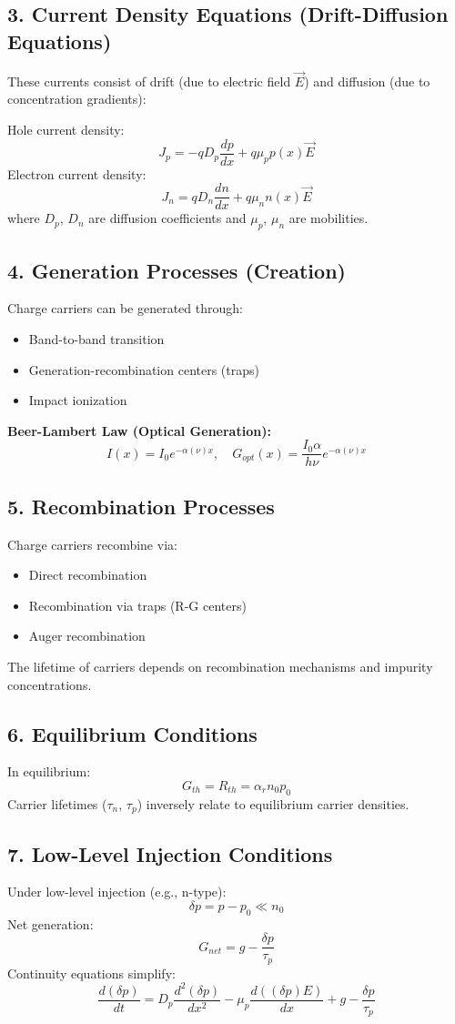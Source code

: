\documentclass{article}
\begin{document}
\subsection*{3. Current Density Equations (Drift-Diffusion Equations)}
These currents consist of drift (due to electric field $\vec{E}$) and diffusion (due to concentration gradients):

Hole current density:
\[
J_p = -qD_p\frac{dp}{dx} + q\mu_p p(x)\vec{E}
\]
Electron current density:
\[
J_n = qD_n\frac{dn}{dx} + q\mu_n n(x)\vec{E}
\]
where $D_p$, $D_n$ are diffusion coefficients and $\mu_p$, $\mu_n$ are mobilities.

\subsection*{4. Generation Processes (Creation)}
Charge carriers can be generated through:
\begin{itemize}
\item Band-to-band transition
\item Generation-recombination centers (traps)
\item Impact ionization
\end{itemize}

\textbf{Beer-Lambert Law (Optical Generation):}
\[
I(x) = I_0 e^{-\alpha(\nu)x}, \quad G_{opt}(x) = \frac{I_0\alpha}{h\nu} e^{-\alpha(\nu)x}
\]

\subsection*{5. Recombination Processes}
Charge carriers recombine via:
\begin{itemize}
\item Direct recombination
\item Recombination via traps (R-G centers)
\item Auger recombination
\end{itemize}

The lifetime of carriers depends on recombination mechanisms and impurity concentrations.

\subsection*{6. Equilibrium Conditions}
In equilibrium:
\[
G_{th} = R_{th} = \alpha_r n_0 p_0
\]
Carrier lifetimes ($\tau_n$, $\tau_p$) inversely relate to equilibrium carrier densities.

\subsection*{7. Low-Level Injection Conditions}
Under low-level injection (e.g., n-type):
\[
\delta p = p - p_0 \ll n_0
\]
Net generation:
\[
G_{net} = g - \frac{\delta p}{\tau_p}
\]
Continuity equations simplify:
\[
\frac{d(\delta p)}{dt} = D_p \frac{d^2(\delta p)}{dx^2} - \mu_p \frac{d((\delta p)E)}{dx} + g - \frac{\delta p}{\tau_p}
\]
\end{document}
